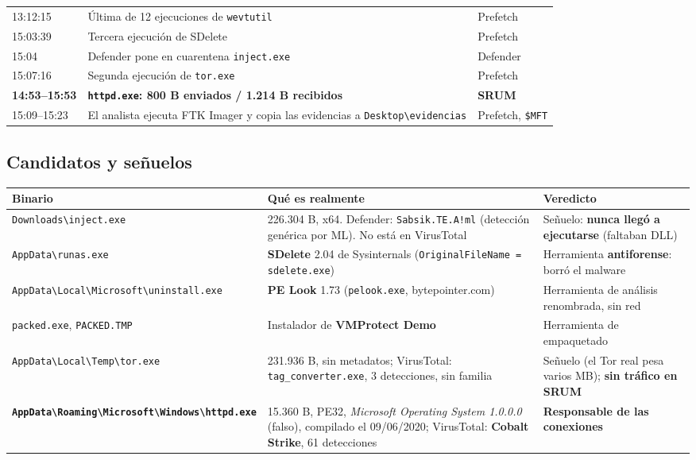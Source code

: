 \documentclass[11pt,a4paper]{article}
\newcommand{\bs}{\textbackslash\allowbreak{}}
\begin{document}
\begin{longtable}{@{}L{2.3cm}L{9.6cm}L{3.2cm}@{}}
13:12:15 & Última de 12 ejecuciones de \texttt{wevtutil} & Prefetch \\
15:03:39 & Tercera ejecución de SDelete & Prefetch \\
15:04 & Defender pone en cuarentena \texttt{inject.exe} & Defender \\
15:07:16 & Segunda ejecución de \texttt{tor.exe} & Prefetch \\
\textbf{14:53--15:53} & \textbf{\texttt{httpd.exe}: 800 B enviados / 1.214 B recibidos} & \textbf{SRUM} \\
15:09--15:23 & El analista ejecuta FTK Imager y copia las evidencias a \texttt{Desktop\bs evidencias} & Prefetch, \texttt{\$MFT} \\
\bottomrule
\end{longtable}

\subsection{Candidatos y señuelos}
\begin{longtable}{@{}L{3.6cm}L{6.2cm}L{5.3cm}@{}}
\toprule
\textbf{Binario} & \textbf{Qué es realmente} & \textbf{Veredicto} \\ \midrule \endhead
\texttt{Downloads\bs inject.exe} & 226.304 B, x64. Defender: \texttt{Sabsik.TE.A!ml} (detección genérica por ML). No está en VirusTotal & Señuelo: \textbf{nunca llegó a ejecutarse} (faltaban DLL) \\
\texttt{AppData\bs runas.exe} & \textbf{SDelete} 2.04 de Sysinternals (\texttt{OriginalFileName = sdelete.exe}) & Herramienta \textbf{antiforense}: borró el malware \\
\texttt{AppData\bs Local\bs Microsoft\bs uninstall.exe} & \textbf{PE Look} 1.73 (\texttt{pelook.exe}, bytepointer.com) & Herramienta de análisis renombrada, sin red \\
\texttt{packed.exe}, \texttt{PACKED.TMP} & Instalador de \textbf{VMProtect Demo} & Herramienta de empaquetado \\
\texttt{AppData\bs Local\bs Temp\bs tor.exe} & 231.936 B, sin metadatos; VirusTotal: \texttt{tag\_converter.exe}, 3 detecciones, sin familia & Señuelo (el Tor real pesa varios MB); \textbf{sin tráfico en SRUM} \\
\textbf{\texttt{AppData\bs Roaming\bs Microsoft\bs Windows\bs httpd.exe}} & 15.360 B, PE32, \emph{Microsoft Operating System 1.0.0.0} (falso), compilado el 09/06/2020; VirusTotal: \textbf{Cobalt Strike}, 61 detecciones & \textbf{Responsable de las conexiones} \\
\bottomrule
\end{longtable}
\end{document}
